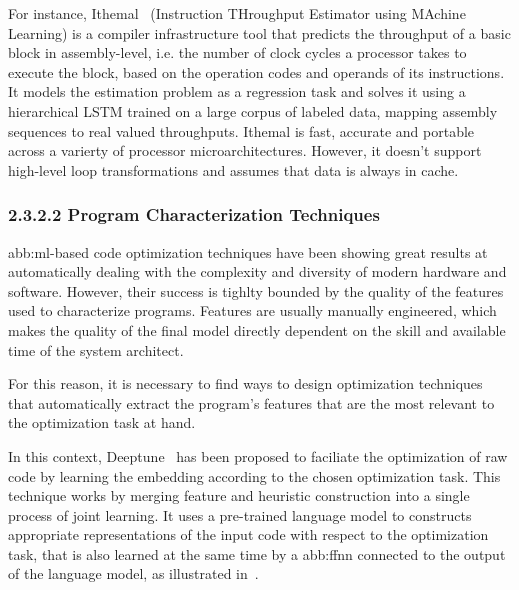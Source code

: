             For instance, Ithemal~\cite{ithemal} (Instruction THroughput Estimator using MAchine Learning) is a compiler infrastructure tool that predicts the throughput of a basic block in assembly-level, i.e. the number of clock cycles a processor takes to execute the block, based on the operation codes and operands of its instructions. It models the estimation problem as a regression task and solves it using a hierarchical LSTM trained on a large corpus of labeled data, mapping assembly sequences to real valued throughputs. Ithemal is fast, accurate and portable across a varierty of processor microarchitectures. However, it doesn't support high-level loop transformations and assumes that data is always in cache.

        \subsubsection{2.3.2.2   Program Characterization Techniques}
            \gls{abb:ml}-based code optimization techniques have been showing great results at automatically dealing with the complexity and diversity of modern hardware and software. However, their success is tighlty bounded by the quality of the features used to characterize programs. Features are usually manually engineered, which  makes the quality of the final model directly dependent on the skill and available time of the system architect.

            For this reason, it is necessary to find ways to design optimization techniques that automatically extract the program’s features that are the most relevant to the optimization task at hand.
            
            In this context, Deeptune~\cite{deeptune} has been proposed to faciliate the optimization of raw code by learning the embedding according to the chosen optimization task. This technique works by merging feature and heuristic construction into a single process of joint learning. It uses a pre-trained language model to constructs appropriate representations of the input code with respect to the optimization task, that is also learned at the same time by a \gls{abb:ffnn} connected to the output of the language model, as illustrated in~.

